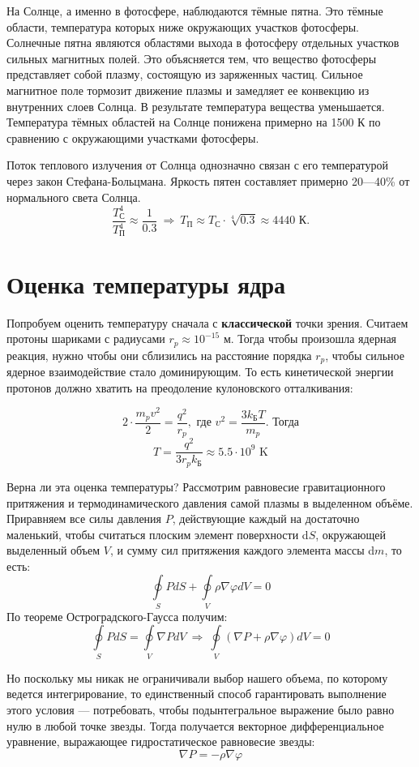 \documentclass[a4paper,12pt]{article}
\begin{document}
На Солнце, а именно в фотосфере, наблюдаются тёмные пятна. Это тёмные области, температура которых ниже окружающих участков фотосферы. Солнечные пятна являются областями выхода в фотосферу отдельных участков сильных магнитных полей. Это объясняется тем, что вещество фотосферы представляет собой плазму, состоящую из заряженных частиц. Сильное магнитное поле тормозит движение плазмы и замедляет ее конвекцию из внутренних слоев Солнца. В результате температура вещества уменьшается. Температура тёмных областей на Солнце понижена примерно на 1500 К по сравнению с окружающими участками фотосферы.

Поток теплового излучения от Солнца однозначно связан с его температурой через закон Стефана-Больцмана. Яркость пятен составляет примерно 20---40\% от нормального света Солнца.
\[
\frac{T_{\text{С}}^4}{T_{\text{П}}^4} \approx \frac{1}{0.3}\ \Rightarrow\ T_{\text{П}} \approx T_{\text{С}} \cdot \sqrt[4]{0.3} \approx 4440 \text{ К}.
\]


\newpage
\section*{Оценка температуры ядра}

Попробуем оценить температуру сначала с \textbf{классической} точки зрения. Считаем протоны шариками с радиусами $r_p \approx 10^{-15}$ м. Тогда чтобы произошла ядерная реакция, нужно чтобы они сблизились на расстояние порядка $r_p$, чтобы сильное ядерное взаимодействие стало доминирующим. То есть кинетической энергии протонов должно хватить на преодоление кулоновского отталкивания:

\[
2\cdot\frac{m_pv^2}{2} = \frac{q^2}{r_p}, \text{ где } v^2 = \frac{3k_{\text{Б}}T}{m_p}. \text{ Тогда}
\]
\[
T = \frac{q^2}{3r_pk_{\text{Б}}} \approx 5.5\cdot 10^9\text{ K}
\]

Верна ли эта оценка температуры? Рассмотрим равновесие гравитационного притяжения и термодинамического давления самой плазмы в выделенном объёме. Приравняем все силы давления $P$, действующие каждый на достаточно маленький, чтобы считаться плоским элемент поверхности d$S$, окружающей выделенный объем $V$, и сумму сил притяжения каждого элемента массы d$m$, то есть: 
\[
\oint\limits_S PdS + \oint\limits_V \rho\nabla\varphi dV = 0
\]
По теореме Остроградского-Гаусса получим:
\[
\oint\limits_S PdS = \oint\limits_V \nabla PdV\ \Rightarrow\ \oint\limits_V (\nabla P + \rho\nabla\varphi)dV = 0
\]

Но поскольку мы никак не ограничивали выбор нашего объема, по которому ведется интегрирование, то единственный способ гарантировать выполнение этого условия --- потребовать, чтобы подынтегральное выражение было равно нулю в любой точке звезды. Тогда получается векторное дифференциальное уравнение, выражающее гидростатическое равновесие звезды:
\[
\nabla P = -\rho\nabla\varphi
\]
\end{document}
